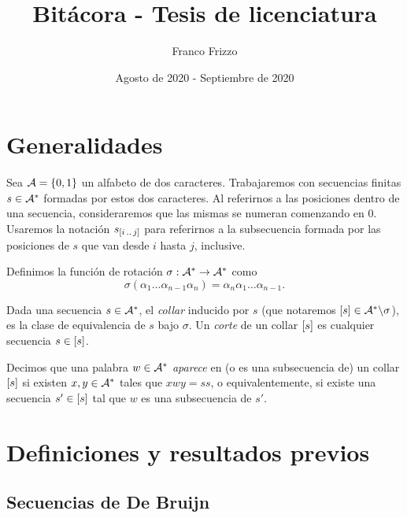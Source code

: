 \documentclass[11pt]{article}
\newcommand\myauthor{Franco Frizzo}
\newcommand\mytitle{Bitácora - Tesis de licenciatura}
\newcommand\mydate{Agosto de 2020 - Septiembre de 2020}
\begin{document}
\title{\mytitle}
\author{\myauthor}
\date{\mydate}

\maketitle
\tableofcontents
\newpage

\section{Generalidades}

Sea $\mathcal{A} = \lbrace0, 1\rbrace$ un alfabeto de dos caracteres.
Trabajaremos con secuencias finitas $s \in \mathcal{A}^*$ formadas por estos dos
caracteres. Al referirnos a las posiciones dentro de una secuencia,
consideraremos que las mismas se numeran comenzando en $0$. Usaremos la
notación $s_{[i\,..\,j]}$ para referirnos a la subsecuencia formada por las
posiciones de $s$ que van desde $i$ hasta $j$, inclusive.

\begin{definition}
	Definimos la función de rotación $\sigma: \mathcal{A}^* \to \mathcal{A}^*$ como
	\[ \sigma(\alpha_1\dots\alpha_{n-1}\alpha_n) =
		\alpha_n\alpha_1\dots\alpha_{n-1}. \]
\end{definition}

\begin{definition}
	Dada una secuencia $s \in \mathcal{A}^*$, el \emph{collar} inducido por $s$
	(que notaremos $\left[s\right] \in \mathcal{A}^*\backslash\sigma$), es la clase de
	equivalencia de $s$ bajo $\sigma$. Un \emph{corte} de un collar $\left[s\right]$
	es cualquier secuencia $s \in \left[s\right]$.
\end{definition}

\begin{definition}

	Decimos que una palabra $w \in \mathcal{A}^*$ \emph{aparece} en (o es una
	subsecuencia de) un collar $\left[s\right]$ si existen $x, y \in \mathcal{A}^*$ tales
	que $xwy = ss$, o equivalentemente, si existe una secuencia $s' \in \left[s\right]$
	tal que $w$ es una subsecuencia de $s'$.
\end{definition}

\section{Definiciones y resultados previos}

\subsection{Secuencias de De Bruijn}
\end{document}
